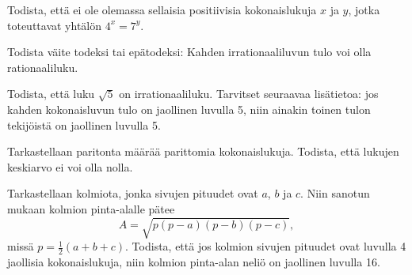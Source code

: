 \begin{kotitehtavasivu}
	\begin{tehtava}
		Todista, että ei ole olemassa sellaisia positiivisia kokonaislukuja $x$ ja $y$, jotka toteuttavat
		yhtälön $4^{x} = 7^{y}$.
		\begin{vastaus}
		\end{vastaus}
	\end{tehtava}

	\begin{tehtava}
		Todista väite todeksi tai epätodeksi: Kahden
		irrationaaliluvun tulo voi olla rationaaliluku.
		\begin{vastaus}
		\end{vastaus}
	\end{tehtava}

	\begin{tehtava}
		Todista, että luku $\sqrt{5}$ on irrationaaliluku.
		Tarvitset seuraavaa lisätietoa: jos kahden kokonaisluvun
		tulo on jaollinen luvulla 5, niin ainakin toinen tulon
		tekijöistä on jaollinen luvulla 5.
		\begin{vastaus}
		\end{vastaus}
	\end{tehtava}

	\begin{tehtava}
		Tarkastellaan paritonta määrää parittomia kokonaislukuja.
		Todista, että lukujen keskiarvo ei voi olla nolla.
		\begin{vastaus}
		\end{vastaus}
	\end{tehtava}

	\begin{tehtava}
		Tarkastellaan kolmiota, jonka sivujen pituudet ovat
		$a$, $b$ ja $c$. Niin sanotun  mukaan
		kolmion pinta-alalle pätee \[A = \sqrt{p(p-a)(p-b)(p-c)},\]
		missä $p = \frac{1}{2}(a+b+c)$. Todista, että jos kolmion
		sivujen pituudet ovat luvulla 4 jaollisia kokonaislukuja,
		niin kolmion pinta-alan neliö on jaollinen luvulla 16.
		\begin{vastaus}
		\end{vastaus}
	\end{tehtava}


\end{kotitehtavasivu}
